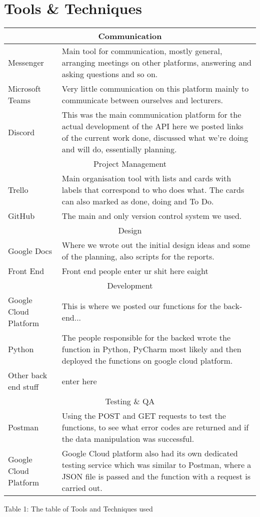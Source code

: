 \documentclass{article}
\begin{document}
\section{Tools \& Techniques}
\begin{tabularx}{\textwidth}{|l|X|}
\hline 
\multicolumn{2}{|c|}{Communication}\\
\hline
Messenger & Main tool for communication, mostly general, arranging meetings on other platforms, answering and asking questions and so on.\\
\hline
Microsoft Teams & Very little communication on this platform mainly to communicate between ourselves and lecturers.\\
\hline
Discord & This was the main communication platform for the actual development of the API here we posted links of the current work done, discussed what we're doing and will do, essentially planning.\\
\hline 
\hline
\multicolumn{2}{|c|}{Project Management}\\
\hline
Trello & Main organisation tool with lists and cards with labels that correspond to who does what. The cards can also marked as done, doing and To Do. \\
\hline
GitHub & The main and only version control system we used.\\
\hline 
\hline
\multicolumn{2}{|c|}{Design}\\
\hline
Google Docs & Where we wrote out the initial design ideas and some of the planning, also scripts for the reports.\\
\hline
Front End & Front end people enter ur shit here eaight\\
\hline 
\hline
\multicolumn{2}{|c|}{Development}\\
\hline
Google Cloud Platform & This is where we posted our functions for the back-end...\\
\hline
Python & The people responsible for the backed wrote the function in Python, PyCharm most likely and then deployed the functions on google cloud platform.\\
\hline
Other back end stuff & enter here\\
\hline 
\hline
\multicolumn{2}{|c|}{Testing \& QA}\\
\hline
Postman & Using the POST and GET requests to test the functions, to see what error codes are returned and if the data
manipulation was successful.\\
\hline
Google Cloud Platform& Google Cloud platform also had its own dedicated testing service which was similar to Postman, where a JSON file is passed and the function with a request is carried out.\\
\hline 


\end{tabularx}
\caption{\label{tab:table-name}Table 1: The table of Tools and Techniques used}
\clearpage
\end{document}
